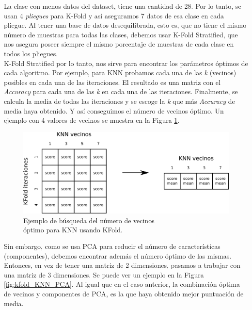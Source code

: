 La clase con menos datos del dataset, tiene una cantidad de 28. Por lo tanto, se usan 4 \textit{pliegues} para K-Fold y así aseguramos 7 datos de esa clase en cada pliegue. Al tener una base de datos desequilibrada, esto es, que no tiene el mismo número de muestras para todas las clases, debemos usar K-Fold Stratified, que nos asegura poseer siempre el mismo porcentaje de muestras de cada clase en todos los pliegues.\\

K-Fold Stratified por lo tanto, nos sirve para encontrar los parámetros óptimos de cada algoritmo. Por ejemplo, para KNN probamos cada una de las \textit{k} (vecinos) posibles en cada una de las iteraciones. El resultado es una matriz con el \textit{Accuracy} para cada una de las \textit{k} en cada una de las iteraciones. Finalmente, se calcula la media de todas las iteraciones y se escoge la \textit{k} que más \textit{Accuracy} de media haya obtenido. Y así conseguimos el número de vecinos óptimo. Un ejemplo con 4 valores de vecinos se muestra en la Figura \ref{fig:kfold_KNN}.\\

\begin{figure} [h!]
  \begin{center}
    \includegraphics[width=13cm]{figs/KFold_KNN.png}
  \end{center}
  \captionsetup{justification=centering}
  \caption{Ejemplo de búsqueda del número de vecinos\\
  óptimo para KNN usando KFold.}
  \label{fig:kfold_KNN}
\end{figure}

Sin embargo, como se usa PCA para reducir el número de características (componentes), debemos encontrar además el número óptimo de las mismas. Entonces, en vez de tener una matriz de 2 dimensiones, pasamos a trabajar con una matriz de 3 dimensiones. Se puede ver un ejemplo en la Figura \ref{fig:kfold_KNN_PCA}. Al igual que en el caso anterior, la combinación óptima de vecinos y componentes de PCA, es la que haya obtenido mejor puntuación de media.\\

